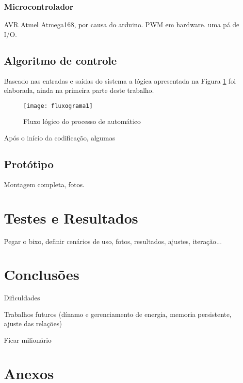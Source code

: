 \documentclass[a4paper,11pt]{article}
\begin{document}
\subsubsection{Microcontrolador}
\label{sec:mcu}
AVR Atmel Atmega168, por causa do arduino. PWM em hardware. uma pá de I/O.
%
\subsection{Algoritmo de controle}
\label{sec:software}
Baseado nas entradas e saídas do sistema a lógica apresentada na Figura
\ref{fig:fluxograma1} foi elaborada, ainda na primeira parte deste trabalho.
\begin{figure}[ht]
 \begin{center}
  \texttt{[image: fluxograma1]}
 \end{center}
 \caption{Fluxo lógico do processo de automático}
 \label{fig:fluxograma1}
\end{figure}
Após o início da codificação, algumas 



 
%
\subsection{Protótipo}
\label{sec:prototipo}
Montagem completa, fotos.

\pagebreak
%
\section{Testes e Resultados}
\label{sec:resultados}
Pegar o bixo, definir cenários de uso, fotos, resultados, ajustes, iteração...

\pagebreak
%
\section{Conclusões}
\label{sec:conclusoes}
Dificuldades

Trabalhos futuros (dínamo e gerenciamento de energia, memoria persistente,
ajuste das relações)

Ficar milionário


\pagebreak
%
\section{Anexos}
\label{sec:anexos}
\end{document}
